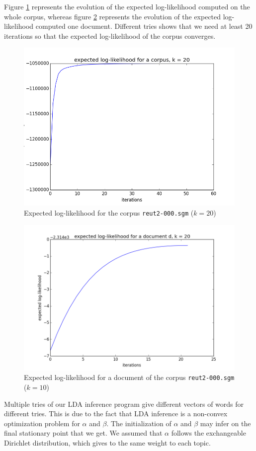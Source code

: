 \documentclass{article}
\begin{document}
Figure \ref{log-likelihood-corpus} represents the evolution of the expected log-likelihood computed on the whole corpus, whereas figure \ref{log-likelihood-doc} represents the evolution of the expected log-likelihood computed one document. Different tries shows that we need at least 20 iterations so that the expected log-likelihood of the corpus converges.

\begin{figure}[ht!]
\begin{center}
\includegraphics[width=0.5\linewidth]{../img/k=20/log_likelihood_corpus_k=20.png}
\caption{Expected log-likelihood for the corpus \texttt{reut2-000.sgm} ($k=20$)}
\label{log-likelihood-corpus}
\end{center}
\end{figure}

\begin{figure}[ht!]
\begin{center}
\includegraphics[width=0.5\linewidth]{../img/k=20/log_likelihood_document_k=20.png}
\caption{Expected log-likelihood for a document of the corpus \texttt{reut2-000.sgm} ($k=10$)}
\label{log-likelihood-doc}
\end{center}
\end{figure}

Multiple tries of our LDA inference program give different vectors of words for different tries. This is due to the fact that LDA inference is a non-convex optimization problem for $\alpha$ and $\beta$. The initialization of $\alpha$ and $\beta$ may infer on the final  stationary point that we get. We assumed that $\alpha$ follows the exchangeable Dirichlet distribution, which gives to the same weight to each topic.  
\end{document}
